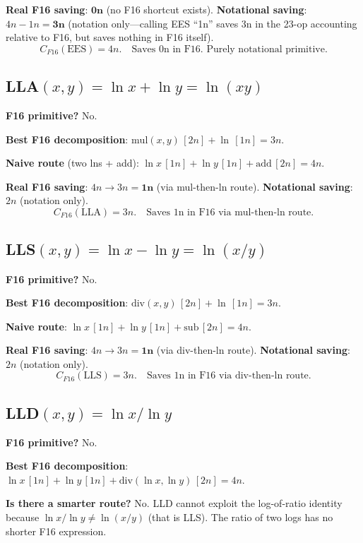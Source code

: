 \documentclass[11pt]{article}
\begin{document}
\textbf{Real F16 saving}: $\mathbf{0n}$ (no F16 shortcut exists).
\textbf{Notational saving}: $4n - 1n = \mathbf{3n}$ (notation only---calling EES ``1n'' saves 3n
in the 23-op accounting relative to F16, but saves nothing in F16 itself).
\[
\boxed{C_{F16}(\mathrm{EES}) = 4n.\quad\text{Saves 0n in F16. Purely notational primitive.}}
\]

\subsection{LLA$(x,y) = \ln x + \ln y = \ln(xy)$}

\textbf{F16 primitive?} No.

\textbf{Best F16 decomposition}:
$\mathrm{mul}(x,y)\,[2n] + \ln\,[1n] = 3n$.

\textbf{Naive route} (two lns + add):
$\ln x\,[1n] + \ln y\,[1n] + \mathrm{add}\,[2n] = 4n$.

\textbf{Real F16 saving}: $4n\to3n = \mathbf{1n}$ (via mul-then-ln route).
\textbf{Notational saving}: $2n$ (notation only).
\[
\boxed{C_{F16}(\mathrm{LLA}) = 3n.\quad\text{Saves 1n in F16 via mul-then-ln route.}}
\]

\subsection{LLS$(x,y) = \ln x - \ln y = \ln(x/y)$}

\textbf{F16 primitive?} No.

\textbf{Best F16 decomposition}:
$\mathrm{div}(x,y)\,[2n] + \ln\,[1n] = 3n$.

\textbf{Naive route}:
$\ln x\,[1n] + \ln y\,[1n] + \mathrm{sub}\,[2n] = 4n$.

\textbf{Real F16 saving}: $4n\to3n = \mathbf{1n}$ (via div-then-ln route).
\textbf{Notational saving}: $2n$ (notation only).
\[
\boxed{C_{F16}(\mathrm{LLS}) = 3n.\quad\text{Saves 1n in F16 via div-then-ln route.}}
\]

\subsection{LLD$(x,y) = \ln x / \ln y$}

\textbf{F16 primitive?} No.

\textbf{Best F16 decomposition}:
$\ln x\,[1n] + \ln y\,[1n] + \mathrm{div}(\ln x,\ln y)\,[2n] = 4n$.

\textbf{Is there a smarter route?} No. LLD cannot exploit the log-of-ratio identity
because $\ln x / \ln y \neq \ln(x/y)$ (that is LLS). The ratio of two logs has no
shorter F16 expression.
\end{document}
